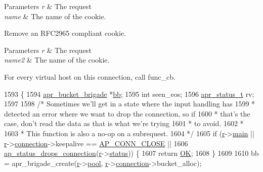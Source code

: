 \begin{DoxyParams}{Parameters}
{\em r} & The request \\
\hline
{\em name} & The name of the cookie.\\
\hline
\end{DoxyParams}
Remove an R\+F\+C2965 compliant cookie.


\begin{DoxyParams}{Parameters}
{\em r} & The request \\
\hline
{\em name2} & The name of the cookie.\\
\hline
\end{DoxyParams}
For every virtual host on this connection, call func\+\_\+cb. 
\begin{DoxyCode}
1593 \{
1594     \hyperlink{structapr__bucket__brigade}{apr\_bucket\_brigade} *\hyperlink{group__APACHE__CORE__PROTO_gaa3f67fb4e98cad3cf7b1633f8d7be67a}{bb};
1595     \textcolor{keywordtype}{int} seen\_eos;
1596     \hyperlink{group__apr__errno_gaa5105fa83cc322f09382292db8b47593}{apr\_status\_t} rv;
1597 
1598     \textcolor{comment}{/* Sometimes we'll get in a state where the input handling has}
1599 \textcolor{comment}{     * detected an error where we want to drop the connection, so if}
1600 \textcolor{comment}{     * that's the case, don't read the data as that is what we're trying}
1601 \textcolor{comment}{     * to avoid.}
1602 \textcolor{comment}{     *}
1603 \textcolor{comment}{     * This function is also a no-op on a subrequest.}
1604 \textcolor{comment}{     */}
1605     \textcolor{keywordflow}{if} (\hyperlink{group__APACHE__CORE__CONFIG_ga091cdd45984e865a888a4f8bb8fe107a}{r}->\hyperlink{structrequest__rec_aa15c110738953554b82619d8d2ee25b3}{main} || \hyperlink{group__APACHE__CORE__CONFIG_ga091cdd45984e865a888a4f8bb8fe107a}{r}->\hyperlink{structrequest__rec_a0924aae55826638314f76952ca5d60b1}{connection}->keepalive == \hyperlink{group__APACHE__CORE__DAEMON_gga0fc39bb8f47f9c1f418f28354416db79ac991e8ec951fe03c8c2f36495859034d}{AP\_CONN\_CLOSE} ||
1606         \hyperlink{group__HTTP__Status_gaf6029c20b468032acad1f82c4806ac6f}{ap\_status\_drops\_connection}(\hyperlink{group__APACHE__CORE__CONFIG_ga091cdd45984e865a888a4f8bb8fe107a}{r}->\hyperlink{structrequest__rec_a09b59ad2fa51be73efea7369b5484eb0}{status})) \{
1607         \textcolor{keywordflow}{return} \hyperlink{group__APACHE__CORE__DAEMON_gaba51915c87d64af47fb1cc59348961c9}{OK};
1608     \}
1609 
1610     bb = apr\_brigade\_create(\hyperlink{group__APACHE__CORE__CONFIG_ga091cdd45984e865a888a4f8bb8fe107a}{r}->\hyperlink{structrequest__rec_aa0a0c16f9a9ab3901cdb3f3c9c9d83d0}{pool}, \hyperlink{group__APACHE__CORE__CONFIG_ga091cdd45984e865a888a4f8bb8fe107a}{r}->\hyperlink{structrequest__rec_a0924aae55826638314f76952ca5d60b1}{connection}->bucket\_alloc);

\end{DoxyCode}
